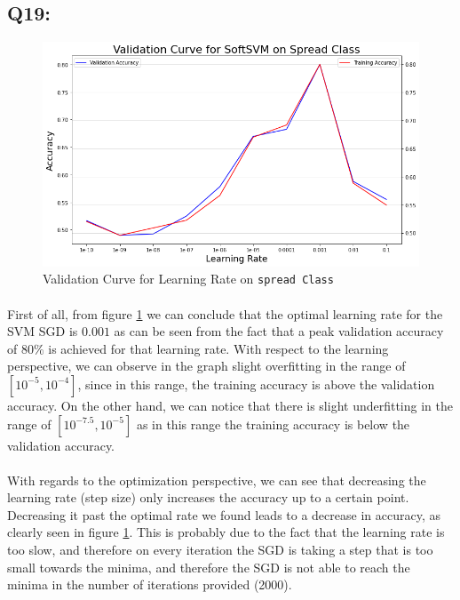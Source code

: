 \documentclass{article}
\newcommand{\code}[1]{\texttt{#1}}
\begin{document}
\subsection*{Q19:}
    \begin{figure}[H]
        \centering
        \includegraphics[scale=0.48]{q19.png}
        \caption{Validation Curve for Learning Rate on \code{spread Class}}
        \label{fig:q19}
    \end{figure}
    \paragraph*{}
    First of all, from figure \ref{fig:q19} we can conclude that the optimal learning rate for the SVM SGD is $0.001$ as can be seen from the fact that a peak validation accuracy of $80\%$ is achieved for that learning rate.
    With respect to the learning perspective, we can observe in the graph slight overfitting in the range of $[10^{-5}, 10^{-4}]$, since in this range, the training accuracy is above the validation accuracy. On the other hand, we can notice that there is slight underfitting in the range of $[10^{-7.5}, 10^{-5}]$ as in this range the training accuracy is below the validation accuracy. 
    \paragraph*{}
    With regards to the optimization perspective, we can see that decreasing the learning rate (step size) only increases the accuracy up to a certain point. Decreasing it past the optimal rate we found leads to a decrease in accuracy, as clearly seen in figure \ref{fig:q19}. This is probably due to the fact that the learning rate is too slow, and therefore on every iteration the SGD is taking a step that is too small towards the minima, and therefore the SGD is not able to reach the minima in the number of iterations provided (2000).
\end{document}
